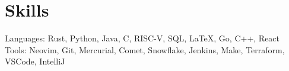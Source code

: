 \documentclass{article}
\let\olditemize=\itemize \let\endolditemize=\enditemize
\renewenvironment{itemize}{\olditemize[topsep=0em] \itemsep-.3em}{\endolditemize}
\begin{document}


\section{Skills}
Languages:
  Rust, Python, Java, C, RISC-V, SQL, LaTeX, Go, C++, React\\
Tools:
  Neovim, Git, Mercurial, Comet, Snowflake, Jenkins, Make, Terraform, VSCode, IntelliJ\\
\end{document}
